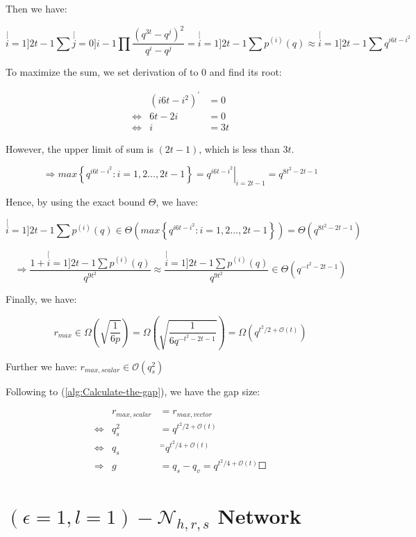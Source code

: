 Then we have:

\[
\stackrel[i=1]{2t-1}{\mathop{\sum}}\stackrel[j=0]{i-1}{\mathop{\prod}}\frac{\left(q^{3t}-q^{j}\right)^{2}}{q^{i}-q^{j}}=\stackrel[i=1]{2t-1}{\mathop{\sum}}p^{(i)}(q)\approx\stackrel[i=1]{2t-1}{\mathop{\sum}}q^{i6t-i^{2}}
\]

To maximize the sum, we set derivation of to 0 and find its root:

\begin{eqnarray*}
 & \left(i6t-i^{2}\right)^{'} & =0\\
\Leftrightarrow & 6t-2i & =0\\
\Leftrightarrow & i & =3t
\end{eqnarray*}

However, the upper limit of sum is $\left(2t-1\right)$, which is
less than $3t$.

\[
\Rightarrow max\left\{ q^{i6t-i^{2}}:i=1,2\ldots,2t-1\right\} =\left.q^{i6t-i^{2}}\right|_{i=2t-1}=q^{8t^{2}-2t-1}
\]

Hence, by using the exact bound $\Theta$, we have:

\[
\stackrel[i=1]{2t-1}{\mathop{\sum}}p^{(i)}(q)\in\Theta\left(max\left\{ q^{i6t-i^{2}}:i=1,2\ldots,2t-1\right\} \right)=\Theta\left(q^{8t^{2}-2t-1}\right)
\]

\[
\Rightarrow\frac{1+\stackrel[i=1]{2t-1}{\mathop{\sum}}p^{(i)}(q)}{q^{9t^{2}}}\approx\frac{\stackrel[i=1]{2t-1}{\mathop{\sum}}p^{(i)}(q)}{q^{9t^{2}}}\in\Theta\left(q^{-t^{2}-2t-1}\right)
\]

Finally, we have:

\[
r_{max}\in\Omega\left(\sqrt{\frac{1}{6p}}\right)=\Omega\left(\sqrt{\frac{1}{6q^{-t^{2}-2t-1}}}\right)=\Omega\left(q^{t^{2}/2+\mathcal{O}\left(t\right)}\right)
\]

Further we have: $r_{max,scalar}\in\mathcal{O}\left(q_{s}^{2}\right)$
\cite{Wachter-Zeh:2018}

Following to (\ref{alg:Calculate-the-gap}), we have the gap size:

\begin{eqnarray*}
 & r_{max,scalar} & =r_{max,vector}\\
\Leftrightarrow & q_{s}^{2} & =q^{t^{2}/2+\mathcal{O}(t)}\\
\Leftrightarrow & q_{s} & ^{=}q^{t^{2}/4+\mathcal{O}(t)}\\
\Rightarrow & g & =q_{s}-q_{v}=q^{t^{2}/4+\mathcal{O}(t)}\Square
\end{eqnarray*}


\section{$\left(\epsilon=1,l=1\right)-\mathcal{N}_{h,r,s}$ Network}

